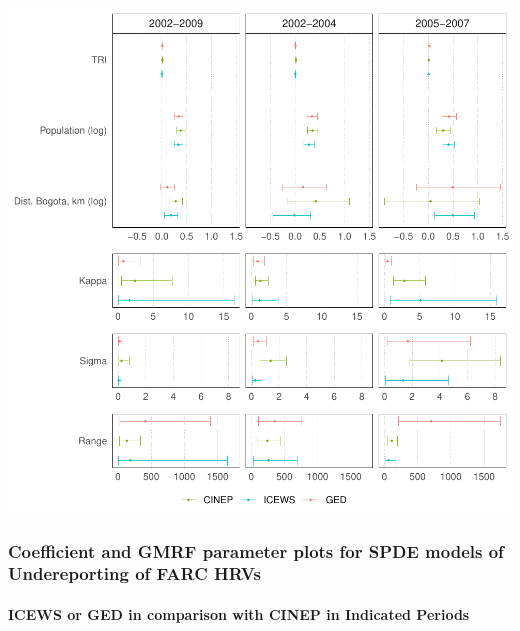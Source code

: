 \documentclass[
]{article}
\begin{document}
\begin{center}\includegraphics[width=1\linewidth]{INLA_Model_Tables_files/figure-latex/unnamed-chunk-6-1} \end{center}

\pagebreak

\hypertarget{coefficient-and-gmrf-parameter-plots-for-spde-models-of-undereporting-of-farc-hrvs}{%
\subsubsection{Coefficient and GMRF parameter plots for SPDE models of Undereporting of FARC HRVs}\label{coefficient-and-gmrf-parameter-plots-for-spde-models-of-undereporting-of-farc-hrvs}}

\hypertarget{icews-or-ged-in-comparison-with-cinep-in-indicated-periods}{%
\paragraph{ICEWS or GED in comparison with CINEP in Indicated Periods}\label{icews-or-ged-in-comparison-with-cinep-in-indicated-periods}}
\end{document}
